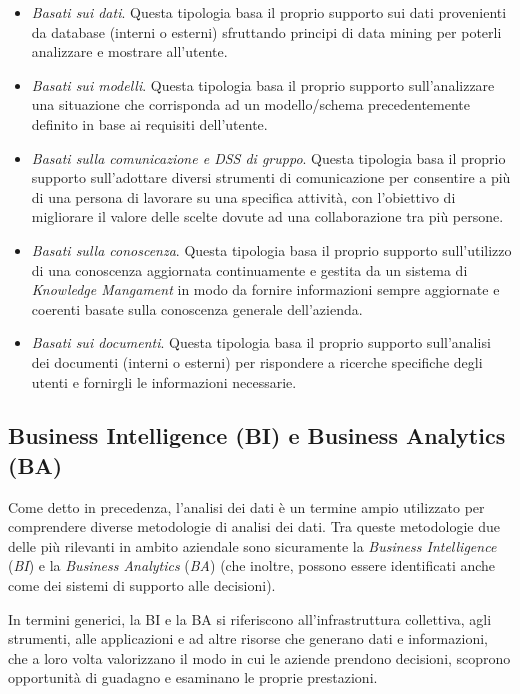 \begin{itemize}
    \item \textit{Basati sui dati}. Questa tipologia basa il proprio supporto sui dati provenienti da database (interni o esterni) sfruttando principi di data mining per poterli analizzare e mostrare all'utente.
    \item \textit{Basati sui modelli}. Questa tipologia basa il proprio supporto sull'analizzare una situazione che corrisponda ad un modello/schema precedentemente definito in base ai requisiti dell'utente.
    \item \textit{Basati sulla comunicazione e DSS di gruppo}. Questa tipologia basa il proprio supporto sull'adottare diversi strumenti di comunicazione per consentire a più di una persona di lavorare su una specifica attività, con l'obiettivo di migliorare il valore delle scelte dovute ad una collaborazione tra più persone.
    \item \textit{Basati sulla conoscenza}. Questa tipologia basa il proprio supporto sull'utilizzo di una conoscenza aggiornata continuamente e gestita da un sistema di \textit{Knowledge Mangament} in modo da fornire informazioni sempre aggiornate e coerenti basate sulla conoscenza generale dell'azienda.
    \item \textit{Basati sui documenti}. Questa tipologia basa il proprio supporto sull'analisi dei documenti (interni o esterni) per rispondere a ricerche specifiche degli utenti e fornirgli le informazioni necessarie. 
\end{itemize}


\subsection{Business Intelligence (BI) e Business Analytics (BA)}
Come detto in precedenza, l'analisi dei dati è un termine ampio utilizzato per comprendere diverse metodologie di analisi dei dati. Tra queste metodologie due delle più rilevanti in ambito aziendale sono sicuramente la \textit{Business Intelligence} (\textit{BI}) e la \textit{Business Analytics} (\textit{BA}) (che inoltre, possono essere identificati anche come dei sistemi di supporto alle decisioni).

In termini generici, la BI e la BA si riferiscono all'infrastruttura collettiva, agli strumenti, alle applicazioni e ad altre risorse che generano dati e informazioni, che a loro volta valorizzano il modo in cui le aziende prendono decisioni, scoprono opportunità di guadagno e esaminano le proprie prestazioni.

